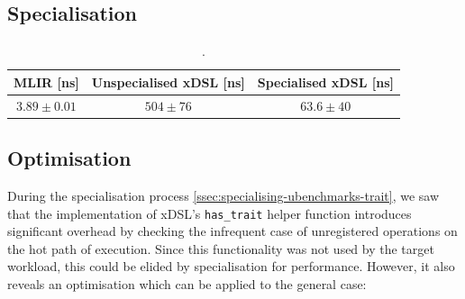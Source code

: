 \subsection{Specialisation}





\begin{table}[H]
  \caption{.}
  \label{tab:ubenchmark-trait-checks-optimised}
  \centering
  \begin{tabular}{ccc}
    \toprule
    \textbf{MLIR [ns]} & \textbf{Unspecialised xDSL [ns]} & \textbf{Specialised xDSL [ns]} \\
    \midrule
    $3.89 \pm 0.01$ & $504 \pm 76$ & $63.6 \pm 40$\\
    \bottomrule
  \end{tabular}
\end{table}





\subsection{Optimisation}


During the specialisation process \autoref{ssec:specialising-ubenchmarks-trait}, we saw that the implementation of xDSL's \texttt{has\_trait} helper function introduces significant overhead by checking the infrequent case of unregistered operations on the hot path of execution.
Since this functionality was not used by the target workload, this could be elided by specialisation for performance. However, it also reveals an optimisation which can be applied to the general case:



